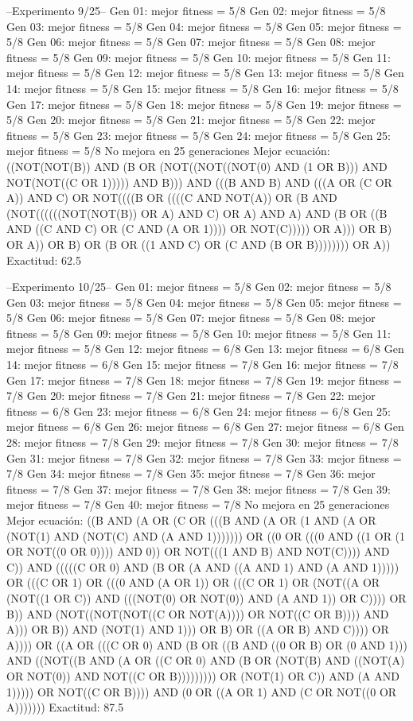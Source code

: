 --Experimento 
 9/25--
Gen 01: mejor fitness = 5/8
Gen 02: mejor fitness = 5/8
Gen 03: mejor fitness = 5/8
Gen 04: mejor fitness = 5/8
Gen 05: mejor fitness = 5/8
Gen 06: mejor fitness = 5/8
Gen 07: mejor fitness = 5/8
Gen 08: mejor fitness = 5/8
Gen 09: mejor fitness = 5/8
Gen 10: mejor fitness = 5/8
Gen 11: mejor fitness = 5/8
Gen 12: mejor fitness = 5/8
Gen 13: mejor fitness = 5/8
Gen 14: mejor fitness = 5/8
Gen 15: mejor fitness = 5/8
Gen 16: mejor fitness = 5/8
Gen 17: mejor fitness = 5/8
Gen 18: mejor fitness = 5/8
Gen 19: mejor fitness = 5/8
Gen 20: mejor fitness = 5/8
Gen 21: mejor fitness = 5/8
Gen 22: mejor fitness = 5/8
Gen 23: mejor fitness = 5/8
Gen 24: mejor fitness = 5/8
Gen 25: mejor fitness = 5/8
No mejora en 25 generaciones
Mejor ecuación: ((NOT(NOT(B)) AND (B OR (NOT((NOT((NOT(0) AND (1 OR B))) AND NOT(NOT((C OR 1))))) AND B))) AND (((B AND B) AND (((A OR (C OR A)) AND C) OR NOT((((B OR ((((C AND NOT(A)) OR (B AND (NOT((((((NOT(NOT(B)) OR A) AND C) OR A) AND A) AND (B OR ((B AND ((C AND C) OR (C AND (A OR 1)))) OR NOT(C))))) OR A))) OR B) OR A)) OR B) OR (B OR ((1 AND C) OR (C AND (B OR B)))))))) OR A))
 Exactitud: 62.5%

--Experimento 
 10/25--
Gen 01: mejor fitness = 5/8
Gen 02: mejor fitness = 5/8
Gen 03: mejor fitness = 5/8
Gen 04: mejor fitness = 5/8
Gen 05: mejor fitness = 5/8
Gen 06: mejor fitness = 5/8
Gen 07: mejor fitness = 5/8
Gen 08: mejor fitness = 5/8
Gen 09: mejor fitness = 5/8
Gen 10: mejor fitness = 5/8
Gen 11: mejor fitness = 5/8
Gen 12: mejor fitness = 6/8
Gen 13: mejor fitness = 6/8
Gen 14: mejor fitness = 6/8
Gen 15: mejor fitness = 7/8
Gen 16: mejor fitness = 7/8
Gen 17: mejor fitness = 7/8
Gen 18: mejor fitness = 7/8
Gen 19: mejor fitness = 7/8
Gen 20: mejor fitness = 7/8
Gen 21: mejor fitness = 7/8
Gen 22: mejor fitness = 6/8
Gen 23: mejor fitness = 6/8
Gen 24: mejor fitness = 6/8
Gen 25: mejor fitness = 6/8
Gen 26: mejor fitness = 6/8
Gen 27: mejor fitness = 6/8
Gen 28: mejor fitness = 7/8
Gen 29: mejor fitness = 7/8
Gen 30: mejor fitness = 7/8
Gen 31: mejor fitness = 7/8
Gen 32: mejor fitness = 7/8
Gen 33: mejor fitness = 7/8
Gen 34: mejor fitness = 7/8
Gen 35: mejor fitness = 7/8
Gen 36: mejor fitness = 7/8
Gen 37: mejor fitness = 7/8
Gen 38: mejor fitness = 7/8
Gen 39: mejor fitness = 7/8
Gen 40: mejor fitness = 7/8
No mejora en 25 generaciones
Mejor ecuación: ((B AND (A OR (C OR (((B AND (A OR (1 AND (A OR (NOT(1) AND (NOT(C) AND (A AND 1))))))) OR ((0 OR (((0 AND ((1 OR (1 OR NOT((0 OR 0)))) AND 0)) OR NOT(((1 AND B) AND NOT(C)))) AND C)) AND (((((C OR 0) AND (B OR (A AND ((A AND 1) AND (A AND 1))))) OR (((C OR 1) OR (((0 AND (A OR 1)) OR (((C OR 1) OR (NOT((A OR (NOT((1 OR C)) AND (((NOT(0) OR NOT(0)) AND (A AND 1)) OR C)))) OR B)) AND (NOT((NOT(NOT((C OR NOT(A)))) OR NOT((C OR B)))) AND A))) OR B)) AND (NOT(1) AND 1))) OR B) OR ((A OR B) AND C)))) OR A)))) OR ((A OR (((C OR 0) AND (B OR ((B AND ((0 OR B) OR (0 AND 1))) AND ((NOT((B AND (A OR ((C OR 0) AND (B OR (NOT(B) AND ((NOT(A) OR NOT(0)) AND NOT((C OR B))))))))) OR (NOT(1) OR C)) AND (A AND 1))))) OR NOT((C OR B)))) AND (0 OR ((A OR 1) AND (C OR NOT((0 OR A)))))))
 Exactitud: 87.5%


